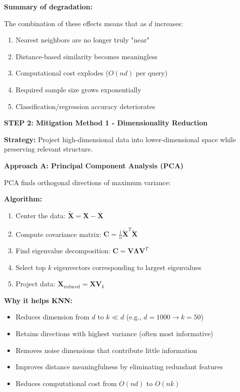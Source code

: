 \documentclass[12pt]{article}
\begin{document}
\begin{solution}
\textbf{Summary of degradation:}

The combination of these effects means that as \(d\) increases:
\begin{enumerate}
    \item Nearest neighbors are no longer truly "near"
    \item Distance-based similarity becomes meaningless
    \item Computational cost explodes (\(O(nd)\) per query)
    \item Required sample size grows exponentially
    \item Classification/regression accuracy deteriorates
\end{enumerate}

\textbf{STEP 2: Mitigation Method 1 - Dimensionality Reduction}

\textbf{Strategy:} Project high-dimensional data into lower-dimensional space while preserving relevant structure.

\textbf{Approach A: Principal Component Analysis (PCA)}

PCA finds orthogonal directions of maximum variance:

\textbf{Algorithm:}
\begin{enumerate}
    \item Center the data: \(\tilde{\mathbf{X}} = \mathbf{X} - \bar{\mathbf{X}}\)
    \item Compute covariance matrix: \(\mathbf{C} = \frac{1}{n}\tilde{\mathbf{X}}^T \tilde{\mathbf{X}}\)
    \item Find eigenvalue decomposition: \(\mathbf{C} = \mathbf{V}\mathbf{\Lambda}\mathbf{V}^T\)
    \item Select top \(k\) eigenvectors corresponding to largest eigenvalues
    \item Project data: \(\mathbf{X}_{\text{reduced}} = \mathbf{X} \mathbf{V}_k\)
\end{enumerate}

\textbf{Why it helps KNN:}
\begin{itemize}
    \item Reduces dimension from \(d\) to \(k \ll d\) (e.g., \(d=1000 \to k=50\))
    \item Retains directions with highest variance (often most informative)
    \item Removes noise dimensions that contribute little information
    \item Improves distance meaningfulness by eliminating redundant features
    \item Reduces computational cost from \(O(nd)\) to \(O(nk)\)
\end{itemize}


\end{solution}
\end{document}

